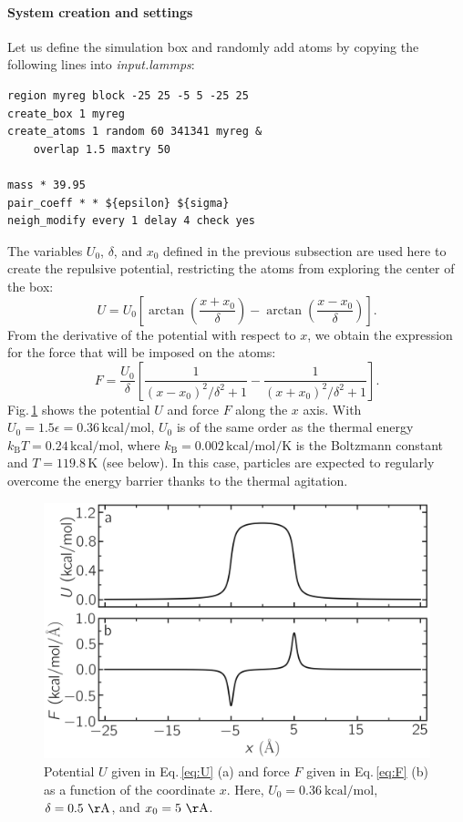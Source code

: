 \documentclass[9pt,tutorial]{livecoms}
\begin{document}
\paragraph{System creation and settings}
\noindent Let us define the simulation box and randomly add atoms by copying the following lines into \textit{input.lammps}:
{\normalsize \begin{verbatim}
region myreg block -25 25 -5 5 -25 25
create_box 1 myreg
create_atoms 1 random 60 341341 myreg &
    overlap 1.5 maxtry 50

mass * 39.95
pair_coeff * * ${epsilon} ${sigma}
neigh_modify every 1 delay 4 check yes
\end{verbatim}}
The variables $U_0$, $\delta$, and $x_0$ defined in the previous subsection are used here to create the repulsive potential, restricting the atoms from exploring the center of the box:
\begin{equation}
U = U_0 \left[ \arctan \left( \dfrac{x+x_0}{\delta} \right) - \arctan \left(\dfrac{x-x_0}{\delta} \right) \right].
\label{eq:U}
\end{equation}
From the derivative of the potential with respect to $x$, we obtain the expression
for the force that will be imposed on the atoms:
\begin{equation}
F= \dfrac{U_0}{\delta} \left[ \dfrac{1}{(x-x_0)^2/\delta^2+1} - \dfrac{1}{(x+x_0)^2/\delta^2+1} \right].
\label{eq:F}
\end{equation}
Fig.\,\ref{fig:potential} shows the potential $U$ and force $F$ along the $x$ axis. With $U_0 = 1.5 \epsilon = 0.36\,\text{kcal/mol}$, $U_0$ is of the same order as the thermal energy $k_\text{B} T = 0.24\,\text{kcal/mol}$, where $k_\text{B} = 0.002\,\text{kcal/mol/K}$ is the Boltzmann constant and $T = 119.8\,\text{K}$ (see below). In this case, particles are expected to regularly overcome the energy barrier thanks to the thermal agitation.

\begin{figure}
\centering
\includegraphics[width=\linewidth]{US-potential}
\caption{Potential $U$ given in Eq.\,\eqref{eq:U} (a) and force $F$ given in Eq.\,\eqref{eq:F} (b) as a function of the coordinate $x$. Here, $U_0 = 0.36~\text{kcal/mol}$, $\delta = 0.5~\mathrm{\AA{}}$, and $x_0 = 5~\mathrm{\AA{}}$.}
\label{fig:potential}
\end{figure}
\end{document}
